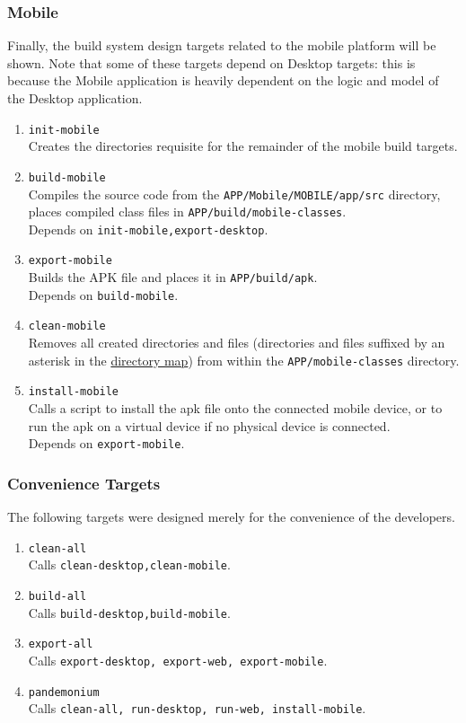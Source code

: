 \documentclass[12pt]{report}
\begin{document}
\subsubsection{Mobile}
Finally, the build system design targets related to the mobile platform will be shown. Note that
some of these targets depend on Desktop targets: this is because the Mobile application is heavily
dependent on the logic and model of the Desktop application.
\begin{enumerate}
	\item \texttt{init-mobile}\\
		Creates the directories requisite for the remainder of the mobile build targets.
	\item \texttt{build-mobile}\\
		Compiles the source code from the \texttt{APP/Mobile/MOBILE/app/src} directory, places
		compiled class files in \texttt{APP/build/mobile-classes}.\\
		Depends on \texttt{init-mobile,export-desktop}.
	\item \texttt{export-mobile}\\
		Builds the APK file and places it in \texttt{APP/build/apk}.\\
		Depends on \texttt{build-mobile}.
	\item \texttt{clean-mobile}\\
		Removes all created directories and files (directories and files suffixed by an asterisk in
		the \hyperref[s:build-dirtree]{directory map}) from within the \texttt{APP/mobile-classes}
		directory.
	\item \texttt{install-mobile}\\
		Calls a script to install the apk file onto the connected mobile device, or to run the apk
		on a virtual device if no physical device is connected.\\
		Depends on \texttt{export-mobile}.
\end{enumerate}
\subsubsection{Convenience Targets}
The following targets were designed merely for the convenience of the developers. 
\begin{enumerate}
	\item \texttt{clean-all}\\
		Calls \texttt{clean-desktop,clean-mobile}.
	\item \texttt{build-all}\\
		Calls \texttt{build-desktop,build-mobile}.
	\item \texttt{export-all}\\
		Calls \texttt{export-desktop, export-web, export-mobile}.
	\item \texttt{pandemonium}\\
		Calls \texttt{clean-all, run-desktop, run-web, install-mobile}.
\end{enumerate}
\end{document}
